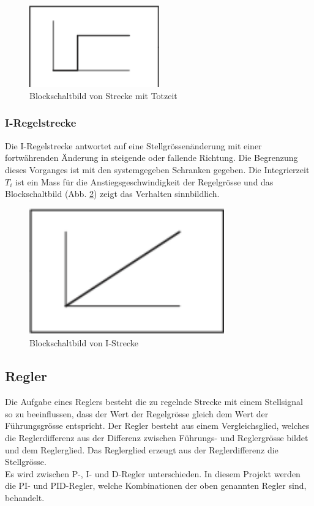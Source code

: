 \begin{figure}[h!, width=\pagewidth]
\begin{center}
\includegraphics[width=0.5\textwidth]{images/TotZeit}
\caption{Blockschaltbild von Strecke mit Totzeit}
\label{fig:TotZeit}
\end{center}
\end{figure}


\subsubsection*{I-Regelstrecke}
Die I-Regelstrecke antwortet auf eine Stellgrössenänderung mit einer fortwährenden 
Änderung in steigende oder fallende Richtung. Die Begrenzung dieses Vorganges ist mit den systemgegeben Schranken gegeben. Die Integrierzeit $T_i$ ist ein Mass für die Anstiegsgeschwindigkeit der Regelgrösse und das Blockschaltbild (Abb. \ref{fig:IStrecke}) zeigt das Verhalten sinnbildlich.
\begin{figure}[h!, width=\pagewidth]
\begin{center}
\includegraphics[width=0.75\textwidth]{images/IStrecke}
\caption{Blockschaltbild von I-Strecke}
\label{fig:IStrecke}
\end{center}
\end{figure}


\subsection{Regler}
Die Aufgabe eines Reglers besteht die zu regelnde Strecke mit einem Stellsignal so zu beeinflussen, dass der Wert der Regelgrösse gleich dem Wert der Führungsgrösse entspricht. Der Regler besteht aus einem Vergleichsglied, welches die Reglerdifferenz aus der Differenz zwischen Führungs- und Reglergrösse bildet und dem Reglerglied. Das Reglerglied erzeugt aus der Reglerdifferenz die Stellgrösse.\\
Es wird zwischen P-, I- und D-Regler unterschieden.
In diesem Projekt werden die PI- und PID-Regler, welche Kombinationen der oben genannten Regler sind, behandelt.\\

